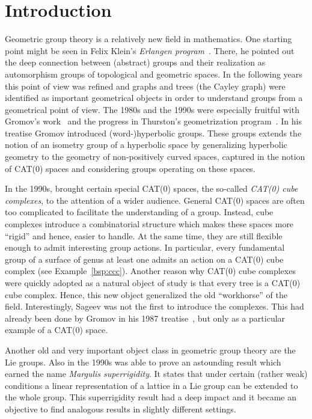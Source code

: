 \section{Introduction}
\label{sec:introduction}

Geometric group theory is a relatively new field in mathematics. One starting point might be seen in Felix Klein's \emph{Erlangen program}~\cite{Klein}. There, he pointed out the deep connection between (abstract) groups and their realization as automorphism groups of topological and geometric spaces. In the following years this point of view was refined and graphs and trees (the Cayley graph) were identified as important geometrical objects in order to understand groups from a geometrical point of view. The 1980s and the 1990s were especially fruitful with Gromov's work\ \cite{MR919829} and the progress in Thurston's geometrization program\ \cite{MR648524}. In his treatise Gromov introduced (word-)hyperbolic groups. These groups extends the notion of an isometry group of a hyperbolic space by generalizing hyperbolic geometry to the geometry of non-positively curved spaces, captured in the notion of CAT(0) spaces and considering groups operating on these spaces.

In the 1990s, \textcite{MR1347406} brought certain special CAT(0) spaces, the so-called \emph{CAT(0) cube complexes}, to the attention of a wider audience. General CAT(0) spaces are often too complicated to facilitate the understanding of a group. Instead, cube complexes introduce a combinatorial structure which makes these spaces more \enquote{rigid} and hence, easier to handle. At the same time, they are still flexible enough to admit interesting group actions. In particular, every fundamental group of a surface of genus at least one admits an action on a CAT(0) cube complex (see Example~\ref{bsp:ccc}). Another reason why CAT(0) cube complexes were quickly adopted as a natural object of study is that every tree is a CAT(0) cube complex. Hence, this new object generalized the old \enquote{workhorse} of the field. Interestingly, Sageev was not the first to introduce the complexes. This had already been done by Gromov in his 1987 treatise\ \cite{MR919829}, but only as a particular example of a CAT(0) space.

Another old and very important object class in geometric group theory are the Lie groups. Also in the 1990s \textcite{MR1090825} was able to prove an astounding result which earned the name \emph{Margulis superrigidity}. It states that under certain (rather weak) conditions a linear representation of a lattice in a Lie group can be extended to the whole group. This superrigidity result had a deep impact and it became an objective to find analogous results in slightly different settings.

